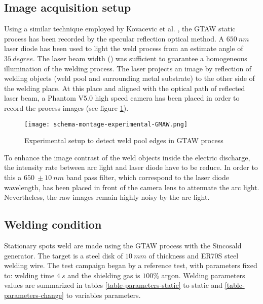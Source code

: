 \begin{Segmentation}
\subsection{ Image acquisition setup}
\label{ image_acquisition_setup}

Using a similar technique employed by Kovacevic et al. \cite{KOVACEVIC}, 
the GTAW static process has been recorded by the specular reflection optical method. 
A $650\ nm$ laser diode has been used to light the weld process from an estimate angle
 of $35\ degree$. The laser beam width ($ $) was sufficient to guarantee a homogeneous 
illumination of the welding process. The laser projects an image by reflection of welding 
objects (weld pool and surrounding metal substrate) to the other side of the welding place.
 At this place and aligned with the optical path of reflected laser beam, a Phantom V5.0 
high speed camera has been placed in order to record the process images (see figure \ref{schema-montage-experimental-GTAW}). 

\begin{figure}
\begin{center}
\texttt{[image: schema-montage-experimental-GMAW.png]}
\caption{{\small Experimental setup to detect weld pool edges in GTAW process}}
\label{schema-montage-experimental-GTAW}
\end{center}
\end{figure}

To enhance the image contrast of the weld objects inside the electric discharge, 
the intensity rate between arc light and laser diode have to be reduce. In order to 
this a $650\ \pm 10\ nm$ band pass filter, which correspond to the laser diode wavelength,
 has been placed in front of the camera lens to attenuate the arc light. Nevertheless, 
the raw images remain highly noisy by the arc light. 


\subsection{ Welding condition}
\label{ welding_conditions}

Stationary spots weld are made using the GTAW process with the Sincosald
 generator. The target is a steel disk of $10\ mm$ of
 thickness and ER70S steel welding wire.
The test campaign began by a reference test, with parameters fixed
 to:  welding time $4\ s$ and the shielding gas is 
 $100\%$ argon. Welding parameters values are summarized in 
tables \ref{table-parameters-static} to static and
 \ref{table-parameters-change} to variables parameters.


\end{Segmentation}
